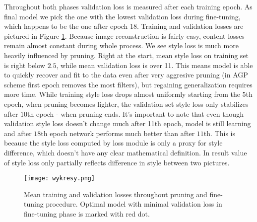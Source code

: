 \documentclass[../Main.tex]{subfiles}
\begin{document}
    Throughout both phases validation loss is measured after each training epoch.
    As final model we pick the one with the lowest validation loss during fine-tuning, 
    which happens to be the one after epoch $18$. Training and validation losses are 
    pictured in Figure \ref{fig:wykresy}. Because image reconstruction is fairly 
    easy, content losses remain almost constant during whole process. We see style 
    loss is much more heavily influenced by pruning. Right at the start, mean style loss 
    on training set is right below $2.5$, while mean validation loss is over 11. This means 
    model is able to quickly recover and fit to the data even after very aggresive pruning 
    (in AGP scheme first epoch removes the most filters), but regaining generalization requires more
    time. While training style loss drops almost uniformly starting from the $5$th epoch, 
    when pruning becomes lighter, the validation set style loss only stabilizes after $10$th epoch - 
    when pruning ends. It's important to note that even though validation style loss 
    doesn't change much after 11th epoch, model is still learning and after $18$th
    epoch network performs much better than after $11$th. This is because the style loss 
    computed by loss module is only a proxy for style difference, which doesn't have 
    any clear mathematical definition. In result value of style loss only partially reflects
    difference in style between two pictures. 
    
    \begin{center}
     \begin{figure}[ht!]
            \texttt{[image: wykresy.png]}
            \caption{Mean training and validation losses throughout pruning and fine-tuning
            procedure. Optimal model with minimal validation loss in fine-tuning phase 
            is marked with red dot.
            }
        \label{fig:wykresy}
    \end{figure}
    \end{center}
    




\biblio %
\end{document}
